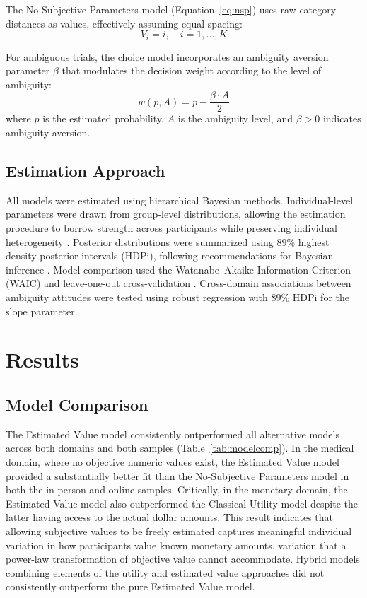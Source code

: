 \documentclass[12pt]{article}
\begin{document}
The No-Subjective Parameters model (Equation~\ref{eq:nsp}) uses raw category distances as values, effectively assuming equal spacing:
\begin{equation}
V_i = i, \quad i = 1, \ldots, K
\label{eq:nsp}
\end{equation}

For ambiguous trials, the choice model incorporates an ambiguity aversion parameter $\beta$ that modulates the decision weight according to the level of ambiguity:
\begin{equation}
w(p, A) = p - \frac{\beta \cdot A}{2}
\label{eq:ambiguity}
\end{equation}
where $p$ is the estimated probability, $A$ is the ambiguity level, and $\beta > 0$ indicates ambiguity aversion.

\subsection{Estimation Approach}

All models were estimated using hierarchical Bayesian methods. Individual-level parameters were drawn from group-level distributions, allowing the estimation procedure to borrow strength across participants while preserving individual heterogeneity \citep{gelman2013bayesian}. Posterior distributions were summarized using 89\% highest density posterior intervals (HDPi), following recommendations for Bayesian inference \citep{kruschke2018bayesian}. Model comparison used the Watanabe--Akaike Information Criterion (WAIC) and leave-one-out cross-validation \citep[LOO-CV;][]{vehtari2017practical}. Cross-domain associations between ambiguity attitudes were tested using robust regression with 89\% HDPi for the slope parameter.

\section{Results}

\subsection{Model Comparison}

The Estimated Value model consistently outperformed all alternative models across both domains and both samples (Table~\ref{tab:modelcomp}). In the medical domain, where no objective numeric values exist, the Estimated Value model provided a substantially better fit than the No-Subjective Parameters model in both the in-person and online samples. Critically, in the monetary domain, the Estimated Value model also outperformed the Classical Utility model despite the latter having access to the actual dollar amounts. This result indicates that allowing subjective values to be freely estimated captures meaningful individual variation in how participants value known monetary amounts, variation that a power-law transformation of objective value cannot accommodate. Hybrid models combining elements of the utility and estimated value approaches did not consistently outperform the pure Estimated Value model.
\end{document}
